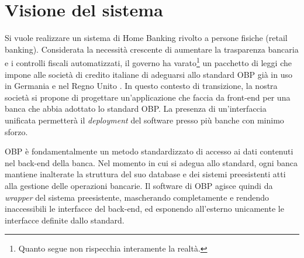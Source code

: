 \documentclass[10pt]{softeng} %
\begin{document}
\flushbottom %

\maketitle %

\tableofcontents %

\thispagestyle{empty} %

\section{Visione del sistema}

Si vuole realizzare un sistema di Home Banking rivolto a persone fisiche (retail banking).
Considerata la necessit\`a crescente di aumentare la trasparenza bancaria e i controlli fiscali automatizzati, il governo ha varato\footnote{Quanto segue non rispecchia interamente la realt\`a.} un pacchetto di leggi che impone alle societ\`a di credito italiane di adeguarsi allo standard OBP \cite{obp} gi\`a in uso in Germania e nel Regno Unito \cite{obpuk}.
In questo contesto di transizione, la nostra societ\`a si propone di progettare un'applicazione che faccia da front-end per una banca che abbia adottato lo standard OBP.
La presenza di un'interfaccia unificata permetter\`a il \emph{deployment} del software presso pi\`u banche con minimo sforzo.

OBP \`e fondamentalmente un metodo standardizzato di accesso ai dati contenuti nel back-end della banca.
Nel momento in cui si adegua allo standard, ogni banca mantiene inalterate la struttura del suo database e dei sistemi preesistenti atti alla gestione delle operazioni bancarie.
Il software di OBP agisce quindi da \emph{wrapper} del sistema preesistente, mascherando completamente e rendendo inaccessibili le interfacce del back-end, ed esponendo all'esterno unicamente le interfacce definite dallo standard.
\end{document}
